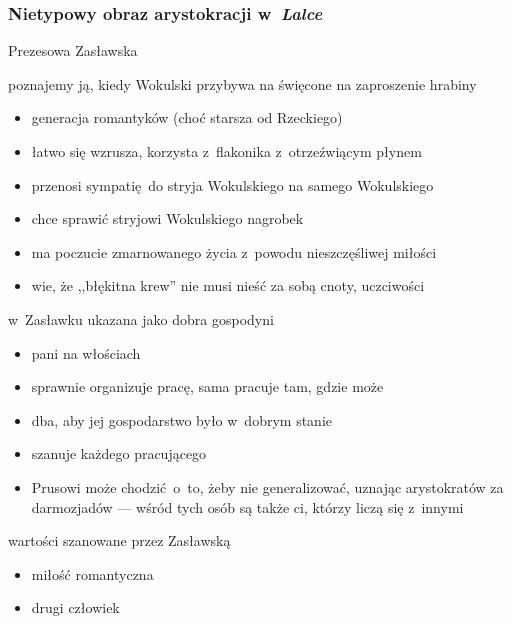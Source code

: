 
\subsubsection*{Nietypowy obraz arystokracji w~\textit{Lalce}}
\begin{description}
    \item Prezesowa Zasławska
        \begin{description}
            \item poznajemy ją, kiedy Wokulski przybywa na święcone na zaproszenie hrabiny
                \begin{itemize}
                    \item generacja romantyków (choć starsza od Rzeckiego)
                    \item łatwo się wzrusza, korzysta z~flakonika z~otrzeźwiącym płynem
                    \item przenosi sympatię do stryja Wokulskiego na samego Wokulskiego
                    \item chce sprawić stryjowi Wokulskiego nagrobek
                    \item ma poczucie zmarnowanego życia z~powodu nieszczęśliwej miłości
                    \item wie, że ,,błękitna krew'' nie musi nieść za sobą cnoty, uczciwości
                \end{itemize}
            \item w~Zasławku ukazana jako dobra gospodyni
                \begin{itemize}
                    \item pani na włościach
                    \item sprawnie organizuje pracę, sama pracuje tam, gdzie może
                    \item dba, aby jej gospodarstwo było w~dobrym stanie
                    \item szanuje każdego pracującego
                    \item Prusowi może chodzić o~to, żeby nie generalizować, uznając arystokratów za darmozjadów --- wśród tych osób są także ci, którzy liczą się z~innymi
                \end{itemize}
            \item wartości szanowane przez Zasławską
                \begin{itemize}
                    \item miłość romantyczna
                    \item drugi człowiek

\end{itemize}
\end{description}
\end{description}
